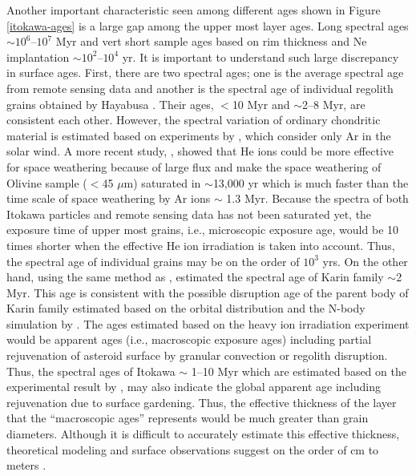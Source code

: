 \documentclass[3p,authoryear]{elsarticle}
\begin{document}
Another important characteristic seen among different ages shown in Figure \ref{itokawa-ages} is a large gap among the upper most layer ages. Long spectral ages $\sim 10^6$--$10^7$ Myr and vert short sample ages based on rim thickness and Ne implantation $\sim 10^2$--$10^4$ yr. It is important to understand such large discrepancy in surface ages. First, there are two spectral ages; one is the average spectral age from remote sensing data \citep{koga2014} and another is the spectral age of individual regolith grains obtained by Hayabusa \citep{bonal2015}. Their ages, $<$10 Myr and $\sim$2--8 Myr, are consistent each other.
 However, the spectral variation of ordinary chondritic material is estimated based on experiments by \citet{strazzulla2005}, which consider only Ar in the solar wind. A more recent study, \citet{loeffler2009}, showed that He ions could be more effective for space weathering because of large flux and make the space weathering of Olivine sample ($<$45 $\mu$m) saturated in $\sim$13,000 yr which is much faster than the time scale of space weathering by Ar ions $\sim$ 1.3 Myr. Because the spectra of both Itokawa particles and remote sensing data has not been saturated yet, the exposure time of upper most grains, i.e., microscopic exposure age, would be 10 times shorter when the effective He ion irradiation is taken into account. Thus, the spectral age of individual grains may be on the order of $10^3$ yrs. On the other hand, using the same method as \citet{bonal2015}, \citet{brunetto2006b} estimated the spectral age of Karin family $\sim$2 Myr. This age is consistent with the possible disruption age of the parent body of Karin family estimated based on the orbital distribution and the N-body simulation by \citet{nesvorny2002}. The ages estimated based on the heavy ion irradiation experiment \citep{strazzulla2005} would be apparent ages (i.e., macroscopic exposure ages) including partial rejuvenation of asteroid surface by granular convection or regolith disruption. Thus, the spectral ages of Itokawa $\sim$ 1--10 Myr \citep{koga2014,bonal2015} which are estimated based on the experimental result by \citet{strazzulla2005}, may also indicate the global apparent age including rejuvenation due to surface gardening. Thus, the effective thickness of the layer that the ``macroscopic ages'' represents would be much greater than grain diameters. Although it is difficult to accurately estimate this effective thickness, theoretical modeling and surface observations suggest on the order of cm to meters \citep{tancredi2012, yamada2016}.
\end{document}
